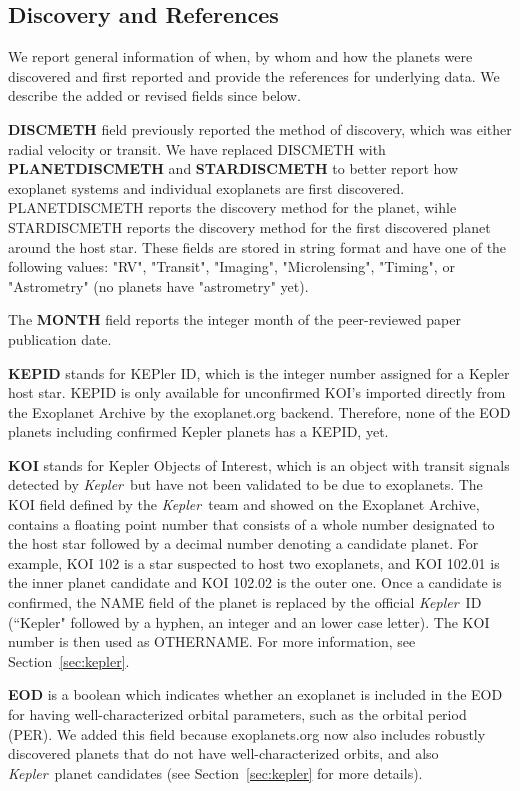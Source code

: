 \documentclass[11pt,preprint]{aastex}
\def\kepler{\textit{Kepler}}
\begin{document}
\begin{CJK*}{UTF8}{gbsn}
\subsection{Discovery and References}\label{sec:disc}

We report general information of when, by whom and how the planets
were discovered and first reported and provide the references for underlying data. We describe the added or
revised fields since \cite{Wright2011} below.

{\bf DISCMETH} field previously reported the method of discovery,
which was either radial velocity or transit. We have replaced DISCMETH
with {\bf PLANETDISCMETH} and \mbox{{\bf STARDISCMETH}} to better
report how exoplanet systems and individual exoplanets are first
discovered. PLANETDISCMETH reports the discovery method for the
planet, wihle STARDISCMETH reports the discovery method for the first
discovered planet around the host star. These fields are stored
in string format and have one of the following values: "RV",
"Transit", "Imaging", "Microlensing", "Timing", or "Astrometry" (no planets have "astrometry" yet).

The {\bf MONTH} field reports the integer month of the
peer-reviewed paper publication date.

{\bf KEPID} stands for KEPler ID, which is the integer number assigned
for a Kepler host star. KEPID is only available for unconfirmed
KOI's imported directly from the Exoplanet Archive by the exoplanet.org backend. Therefore,
none of the EOD planets including confirmed Kepler planets has a KEPID, yet.

{\bf KOI} stands for Kepler Objects of Interest, which is an object
with transit signals detected by \kepler\ but have not been validated to be due to exoplanets. The KOI field defined by the \kepler\ team and showed on the Exoplanet Archive, contains a floating point
number that consists of a whole number designated to the host star
followed by a decimal number denoting a candidate planet. For example,
KOI 102 is a star suspected to host two exoplanets, and KOI 102.01 is
the inner planet candidate and KOI 102.02 is the outer one. Once a
candidate is confirmed, the NAME field of the planet is replaced by
the official \kepler\ ID (``Kepler" followed by a hyphen, an integer
and an lower case letter). The KOI number is then used as
OTHERNAME. For more information, see
Section~\ref{sec:kepler}.

{\bf EOD} is a boolean which indicates whether an exoplanet is included
in the EOD for having well-characterized orbital
parameters, such as the orbital period (PER). We added this field because exoplanets.org
now also includes robustly discovered planets that do not have
well-characterized orbits, and also \kepler\ planet candidates (see
Section~\ref{sec:kepler} for more details).


\end{CJK*}
\end{document}
